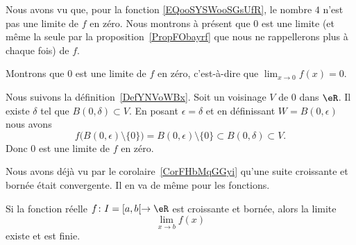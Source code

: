 \begin{example}
	Nous avons vu que, pour la fonction \eqref{EQooSYSWooSGsUfR}, le nombre \( 4\) n'est pas une limite de \( f\) en zéro. Nous montrons à présent que \( 0\) est une limite (et même la seule par la proposition~\ref{PropFObayrf} que nous ne rappellerons plus à chaque fois) de \( f\).

	Montrons que \( 0\) est une limite de \( f\) en zéro, c'est-à-dire que \( \lim_{x\to 0} f(x)=0\).

	Nous suivons la définition~\ref{DefYNVoWBx}. Soit un voisinage \( V\) de \( 0\) dans \( \eR\). Il existe \( \delta\) tel que \( B(0,\delta)\subset V\). En posant \( \epsilon=\delta\) et en définissant \( W=B(0,\epsilon)\) nous avons
	\begin{equation}
		f\big( B(0,\epsilon)\setminus\{ 0 \} \big)=B(0,\epsilon)\setminus\{ 0 \}\subset  B(0,\delta)\subset V.
	\end{equation}
	Donc \( 0\) est une limite de \( f\) en zéro.
\end{example}

Nous avons déjà vu par le corolaire~\ref{CorFHbMqGGyi} qu'une suite croissante et bornée était convergente. Il en va de même pour les fonctions.
\begin{proposition}            \label{PropMTmBYeU}
	Si la fonction réelle \( f\colon I=\mathopen[ a , b [\to \eR\) est croissante et bornée, alors la limite
	\begin{equation}
		\lim_{x\to b} f(x)
	\end{equation}
	existe et est finie.
\end{proposition}

